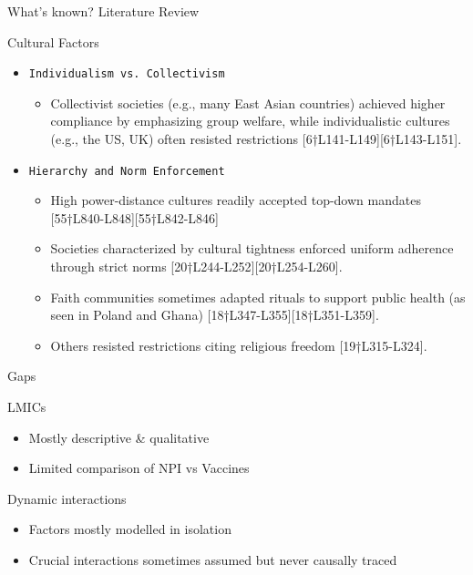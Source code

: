 \documentclass[
  ignorenonframetext,
]{beamer}
\providecommand{\tightlist}{%
  \setlength{\itemsep}{0pt}\setlength{\parskip}{0pt}}\usepackage{longtable,booktabs,array}
\begin{document}
\begin{frame}[fragile]{What's known? Literature Review}
\begin{block}{Cultural Factors}
\label{cultural-factors}
\begin{itemize}
\tightlist
\item
  \texttt{Individualism\ vs.\ Collectivism}

  \begin{itemize}
  \tightlist
  \item
    Collectivist societies (e.g., many East Asian countries) achieved
    higher compliance by emphasizing group welfare, while
    individualistic cultures (e.g., the US, UK) often resisted
    restrictions {[}6†L141-L149{]}{[}6†L143-L151{]}.
  \end{itemize}
\item
  \texttt{Hierarchy\ and\ Norm\ Enforcement}

  \begin{itemize}
  \tightlist
  \item
    High power-distance cultures readily accepted top-down mandates
    {[}55†L840-L848{]}{[}55†L842-L846{]}
  \item
    Societies characterized by cultural tightness enforced uniform
    adherence through strict norms {[}20†L244-L252{]}{[}20†L254-L260{]}.
  \item
    Faith communities sometimes adapted rituals to support public health
    (as seen in Poland and Ghana) {[}18†L347-L355{]}{[}18†L351-L359{]}.
  \item
    Others resisted restrictions citing religious freedom
    {[}19†L315-L324{]}.
  \end{itemize}
\end{itemize}
\end{block}

\begin{block}{Gaps}
\label{gaps}
\begin{block}{LMICs}
\label{lmics}
\begin{itemize}
\tightlist
\item
  Mostly descriptive \& qualitative
\item
  Limited comparison of NPI vs Vaccines
\end{itemize}

\begin{block}{Dynamic interactions}
\label{dynamic-interactions}
\begin{itemize}
\tightlist
\item
  Factors mostly modelled in isolation
\item
  Crucial interactions sometimes assumed but never causally traced


\end{itemize}
\end{block}
\end{block}
\end{block}
\end{frame}
\end{document}
